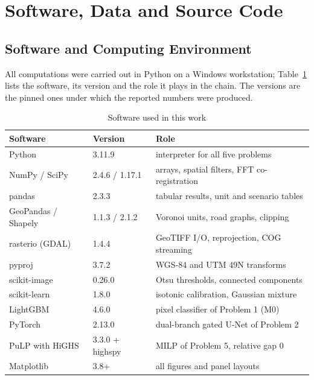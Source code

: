 \section{Software, Data and Source Code}
\label{app:code}


\subsection{Software and Computing Environment}
All computations were carried out in Python on a Windows workstation; Table~\ref{tab:software} lists the software, its version and the role it plays in the chain. The versions are the pinned ones under which the reported numbers were produced.

\begin{table}[H]
\centering
\caption{Software used in this work}
\label{tab:software}
\small
\begin{tabular}{p{}p{}p{}}
\toprule
Software & Version & Role \\
\midrule
Python & 3.11.9 & interpreter for all five problems \\
NumPy / SciPy & 2.4.6 / 1.17.1 & arrays, spatial filters, FFT co-registration \\
pandas & 2.3.3 & tabular results, unit and scenario tables \\
GeoPandas / Shapely & 1.1.3 / 2.1.2 & Voronoi units, road graphs, clipping \\
rasterio (GDAL) & 1.4.4 & GeoTIFF I/O, reprojection, COG streaming \\
pyproj & 3.7.2 & WGS-84 and UTM 49N transforms \\
scikit-image & 0.26.0 & Otsu thresholds, connected components \\
scikit-learn & 1.8.0 & isotonic calibration, Gaussian mixture \\
LightGBM & 4.6.0 & pixel classifier of Problem 1 (M0) \\
PyTorch & 2.13.0 & dual-branch gated U-Net of Problem 2 \\
PuLP with HiGHS & 3.3.0 + highspy & MILP of Problem 5, relative gap 0 \\
Matplotlib & 3.8+ & all figures and panel layouts \\
\bottomrule
\end{tabular}
\end{table}


